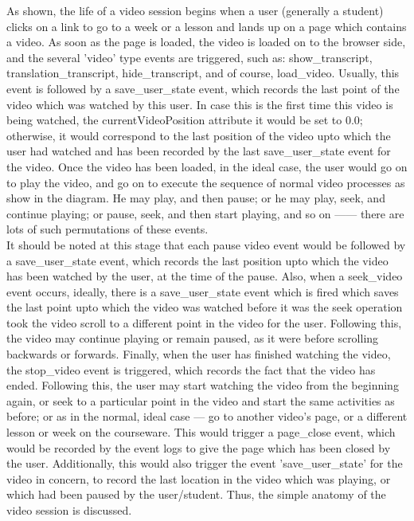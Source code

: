 \documentclass[16pt]{report}
\begin{document}
As shown, the life of a video session begins when a user (generally a student) clicks on a link to go to a week or a lesson and lands up on a page which contains a video. As soon as the page is loaded, the video is loaded on to the browser side, and the several 'video' type events are triggered, such as: show\_transcript, translation\_transcript, hide\_transcript, and of course, load\_video. Usually, this event is followed by a save\_user\_state event, which records the last point of the video which was watched by this user. In case this is the first time this video is being watched, the currentVideoPosition attribute it would be set to 0.0; otherwise, it would correspond to the last position of the video upto which the user had watched and has been recorded by the last save\_user\_state event for the video. Once the video has been loaded, in the ideal case, the user would go on to play the video, and go on to execute the sequence of normal video processes as show in the diagram. He may play, and then pause; or he may play, seek, and continue playing; or pause, seek, and then start playing, and so on ------ there are lots of such permutations of these events.  \\

It should be noted at this stage that each pause video event would be followed by a save\_user\_state event, which records the last position upto which the video has been watched by the user, at the time of the pause. Also, when a seek\_video event occurs, ideally, there is a save\_user\_state event which is fired which saves the last point upto which the video was watched before it was the seek operation took the video scroll to a different point in the video for the user. Following this, the video may continue playing or remain paused, as it were before scrolling backwards or forwards. Finally, when the user has finished watching the video, the stop\_video event is triggered, which records the fact that the video has ended. Following this, the user may start watching the video from the beginning again, or seek to a particular point in the video and start the same activities as before; or as in the normal, ideal case --- go to another video's page, or a different lesson or week on the courseware. This would trigger a page\_close event, which would be recorded by the event logs to give the page which has been closed by the user. Additionally, this would also trigger the event 'save\_user\_state' for the video in concern, to record the last location in the video which was playing, or which had been paused by the user/student. Thus, the simple anatomy of the video session is discussed.\\
\end{document}
